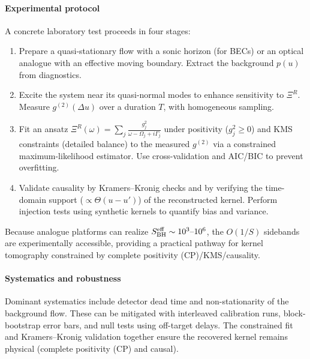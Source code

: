 \documentclass[a4paper,11pt]{article}
\theoremstyle{plain}
\theoremstyle{definition}
\theoremstyle{remark}
\begin{document}
\paragraph{Experimental protocol}
A concrete laboratory test proceeds in four stages:
\begin{enumerate}
  \item Prepare a quasi-stationary flow with a sonic horizon (for BECs) or an optical analogue with an effective moving boundary. Extract the background $p(u)$ from diagnostics.
  \item Excite the system near its quasi-normal modes to enhance sensitivity to $\Xi^R$. Measure $g^{(2)}(\Delta u)$ over a duration $T$, with homogeneous sampling.
  \item Fit an ansatz $\Xi^R(\omega)=\sum_j \frac{g_j^2}{\omega-\Omega_j+i\Gamma_j}$ under positivity ($g_j^2\ge 0$) and KMS constraints (detailed balance) to the measured $g^{(2)}$ via a constrained maximum-likelihood estimator. Use cross-validation and AIC/BIC to prevent overfitting.
  \item Validate causality by Kramers--Kronig checks and by verifying the time-domain support ($\propto \Theta(u-u')$) of the reconstructed kernel. Perform injection tests using synthetic kernels to quantify bias and variance.
\end{enumerate}
Because analogue platforms can realize $S_{\rm BH}^{\rm eff}\sim 10^3\text{--}10^6$, the $O(1/S)$ sidebands are experimentally accessible, providing a practical pathway for kernel tomography constrained by complete positivity (CP)/KMS/causality.

\paragraph{Systematics and robustness}
Dominant systematics include detector dead time and non-stationarity of the background flow. These can be mitigated with interleaved calibration runs, block-bootstrap error bars, and null tests using off-target delays. The constrained fit and Kramers--Kronig validation together ensure the recovered kernel remains physical (complete positivity (CP) and causal).
\end{document}
